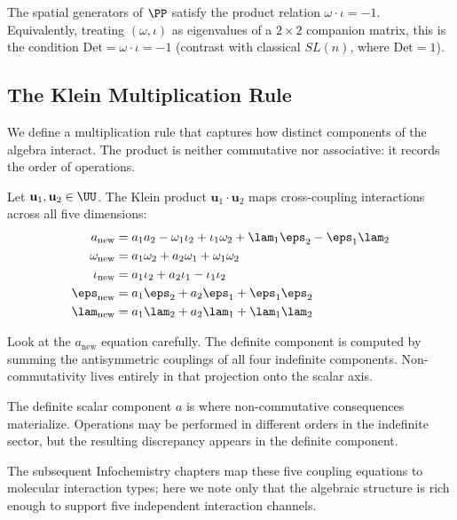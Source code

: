 \begin{definition}\label{def:sl-1}\label{thm:bridge}
The spatial generators of $\PP$ satisfy the product relation $\omega \cdot \iota = -1$. Equivalently, treating $(\omega, \iota)$ as eigenvalues of a $2 \times 2$ companion matrix, this is the condition $\mathrm{Det} = \omega \cdot \iota = -1$ (contrast with classical $SL(n)$, where $\mathrm{Det} = 1$).
\end{definition}

\subsection{The Klein Multiplication Rule}\label{sec:klein}

We define a multiplication rule that captures how distinct components of the algebra interact. The product is neither commutative nor associative: it records the order of operations.

\begin{definition}\label{def:klein}
Let $\mathbf{u}_1, \mathbf{u}_2 \in \UU$. The Klein product $\mathbf{u}_1 \cdot \mathbf{u}_2$ maps cross-coupling interactions across all five dimensions:
\begin{align}
a_{\mathrm{new}} &= a_1 a_2 - \omega_1 \iota_2 + \iota_1 \omega_2 + \lam_1 \eps_2 - \eps_1 \lam_2 \\
\omega_{\mathrm{new}} &= a_1 \omega_2 + a_2 \omega_1 + \omega_1 \omega_2 \\
\iota_{\mathrm{new}} &= a_1 \iota_2 + a_2 \iota_1 - \iota_1 \iota_2 \\
\eps_{\mathrm{new}} &= a_1 \eps_2 + a_2 \eps_1 + \eps_1 \eps_2 \\
\lam_{\mathrm{new}} &= a_1 \lam_2 + a_2 \lam_1 + \lam_1 \lam_2
\end{align}
\end{definition}

\begin{remark}
Look at the $a_{\mathrm{new}}$ equation carefully. The definite component is computed by summing the antisymmetric couplings of all four indefinite components. Non-commutativity lives entirely in that projection onto the scalar axis.

The definite scalar component $a$ is where non-commutative consequences materialize. Operations may be performed in different orders in the indefinite sector, but the resulting discrepancy appears in the definite component.

The subsequent Infochemistry chapters map these five coupling equations to molecular interaction types; here we note only that the algebraic structure is rich enough to support five independent interaction channels.
\end{remark}

